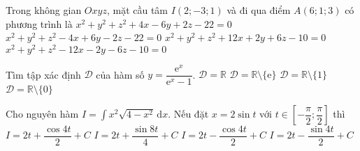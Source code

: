 \begin{ex}%
	Trong không gian $Oxyz$, mặt cầu tâm $I(2;-3;1)$ và đi qua điểm $A(6;1;3)$ có phương trình là
	\choice
	{$x^2+y^2+z^2+4x-6y+2z-22=0$}
	{\True $x^2+y^2+z^2-4x+6y-2z-22=0$}
	{$x^2+y^2+z^2+12x+2y+6z-10=0$}
	{$x^2+y^2+z^2-12x-2y-6z-10=0$}
\end{ex}

\begin{ex}%
	Tìm tập xác định $\mathscr{D}$ của hàm số $y=\dfrac{\mathrm{e}^x}{\mathrm{e}^x-1}$.
	\choice
	{$\mathscr{D}=\mathbb{R}$}
	{$\mathscr{D}=\mathbb{R}\setminus \{\mathrm{e}\}$}
	{$\mathscr{D}=\mathbb{R}\setminus \{1\}$}
	{\True $\mathscr{D}=\mathbb{R}\setminus \{0\}$}
\end{ex}

\begin{ex}%
	Cho nguyên hàm $I=\displaystyle\int\limits x^2\sqrt{4-x^2}\mathrm{\,d}x$. Nếu đặt $x=2\sin t$ với $t\in \left[-\dfrac{\pi}{2};\dfrac{\pi}{2}\right]$ thì
	\choice
	{$I=2t+\dfrac{\cos 4t}{2}+C$}
	{$I=2t+\dfrac{\sin 8t}{4}+C$}
	{$I=2t-\dfrac{\cos 4t}{2}+C$}
	{\True $I=2t-\dfrac{\sin 4t}{2}+C$}
\end{ex}

